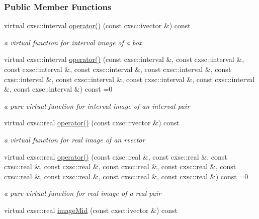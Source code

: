 \subsubsection*{\-Public \-Member \-Functions}
\begin{DoxyCompactItemize}
\item 
virtual cxsc\-::interval \hyperlink{classsubpavings_1_1MappedFobj10D_a15cf283e9113b3142224328ae6c8c4ff}{operator()} (const cxsc\-::ivector \&) const 
\begin{DoxyCompactList}\small\item\em a virtual function for interval image of a box \end{DoxyCompactList}\item 
virtual cxsc\-::interval \hyperlink{classsubpavings_1_1MappedFobj10D_a25e6423b5e185f049369f479dc7d26bd}{operator()} (const cxsc\-::interval \&, const cxsc\-::interval \&, const cxsc\-::interval \&, const cxsc\-::interval \&, const cxsc\-::interval \&, const cxsc\-::interval \&, const cxsc\-::interval \&, const cxsc\-::interval \&, const cxsc\-::interval \&, const cxsc\-::interval \&) const =0
\begin{DoxyCompactList}\small\item\em a pure virtual function for interval image of an interval pair \end{DoxyCompactList}\item 
virtual cxsc\-::real \hyperlink{classsubpavings_1_1MappedFobj10D_ae9424a4d1c8eac86f5b5525f16bed7f7}{operator()} (const cxsc\-::rvector \&) const 
\begin{DoxyCompactList}\small\item\em a virtual function for real image of an rvector \end{DoxyCompactList}\item 
virtual cxsc\-::real \hyperlink{classsubpavings_1_1MappedFobj10D_ac9bb2848cd33f3fd5d9b934daaf60613}{operator()} (const cxsc\-::real \&, const cxsc\-::real \&, const cxsc\-::real \&, const cxsc\-::real \&, const cxsc\-::real \&, const cxsc\-::real \&, const cxsc\-::real \&, const cxsc\-::real \&, const cxsc\-::real \&, const cxsc\-::real \&) const =0
\begin{DoxyCompactList}\small\item\em a pure virtual function for real image of a real pair \end{DoxyCompactList}\item 
virtual cxsc\-::real \hyperlink{classsubpavings_1_1MappedFobj10D_a741176d9acfa04ca52e203b376326bb5}{image\-Mid} (const cxsc\-::ivector \&) const 

\end{DoxyCompactItemize}

